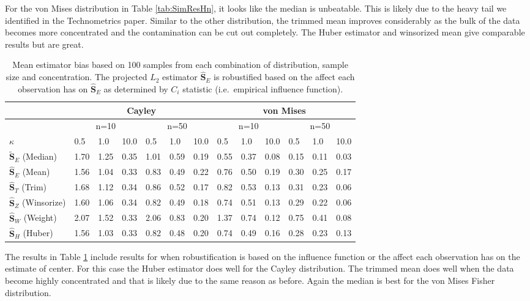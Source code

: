 \documentclass{article}\usepackage[]{graphicx}\usepackage[]{color}
\newcommand{\ProjMean}{{\widehat{\bm S}_{E}}}
\newcommand{\ProjMedian}{{\widetilde{\bm S}_{E}}}
\newcommand{\HuberMean}{{\widehat{\bm S}_H}}
\newcommand{\WeightMean}{{\widehat{\bm S}_W}}
\newcommand{\TrimMean}{{\widehat{\bm S}_T}}
\newcommand{\WinzMean}{{\widehat{\bm S}_Z}}
\newcommand{\red}[1]{{\color{red} #1}}
\begin{document}
For the von Mises distribution in Table \ref{tab:SimResHn}, it looks like the median is unbeatable.  This is likely due to the heavy tail we identified in the Technometrics paper.  Similar to the other distribution, the trimmed mean improves considerably as the bulk of the data becomes more concentrated and the contamination can be cut out completely.  The Huber estimator and winsorized mean give comparable results but are great.

\begin{table}[ht]
\centering
\begin{tabular}{l|lll|lll|lll|lll}
  \hline
 & \multicolumn{6}{|c|}{Cayley} & \multicolumn{6}{|c}{von Mises}   \\ 
\hline
   &  \multicolumn{3}{|c|}{n=10} & \multicolumn{3}{|c|}{n=50} & \multicolumn{3}{|c|}{n=10} & \multicolumn{3}{|c}{n=50} \\
  $\kappa$ &  0.5 &  1.0 & 10.0 &  0.5 &  1.0 & 10.0 &  0.5 &  1.0 & 10.0 &  0.5 &  1.0 & 10.0 \\ \hline
  $\ProjMedian$ (Median) & 1.70 & 1.25 & 0.35 & 1.01 & 0.59 & 0.19 & \red{ 0.55} & \red{ 0.37}& \red{ 0.08} & \red{ 0.15} & \red{ 0.11} & \red{ 0.03} \\ 
  $\ProjMean$ (Mean) & \red{ 1.56} & 1.04 & \red{ 0.33} & 0.83 & 0.49 & 0.22 & 0.76 & 0.50 & 0.19 & 0.30 & 0.25 & 0.17 \\ 
   $\TrimMean$ (Trim) & 1.68 & 1.12 & 0.34 & 0.86 & 0.52 & \red{ 0.17} & 0.82 & 0.53 & 0.13 & 0.31 & 0.23 & 0.06 \\ 
  $\WinzMean$ (Winsorize) & 1.60 & 1.06 & 0.34 & \red{ 0.82} & 0.49 & 0.18 & 0.74 & 0.51 & 0.13 & 0.29 & 0.22 & 0.06 \\ 
  $\WeightMean$ (Weight) & 2.07 & 1.52 & \red{ 0.33} & 2.06 & 0.83 & 0.20 & 1.37 & 0.74 & 0.12 & 0.75 & 0.41 & 0.08 \\ 
  $\HuberMean$ (Huber) & \red{ 1.56 }& \red{ 1.03} & \red{ 0.33} & \red{ 0.82} & \red{ 0.48} & 0.20 & 0.74 & 0.49 & 0.16 & 0.28 & 0.23 & 0.13 \\ 
   \hline
\end{tabular}
\caption{Mean estimator bias based on 100 samples from each combination of distribution, sample size and concentration.  The projected $L_2$ estimator $\ProjMean$ is robustified based on the affect each observation has on $\ProjMean$ as determined by $C_i$ statistic (i.e.~empirical influence function).}
\label{tab:SimResC}
\end{table}

The results in Table \ref{tab:SimResC} include results for when robustification is based on the influence function or the affect each observation has on the estimate of center.  For this case the Huber estimator does well for the Cayley distribution.  The trimmed mean does well when the data become highly concentrated and that is likely due to the same reason as before.  Again the median is best for the von Mises Fisher distribution.  
\end{document}
